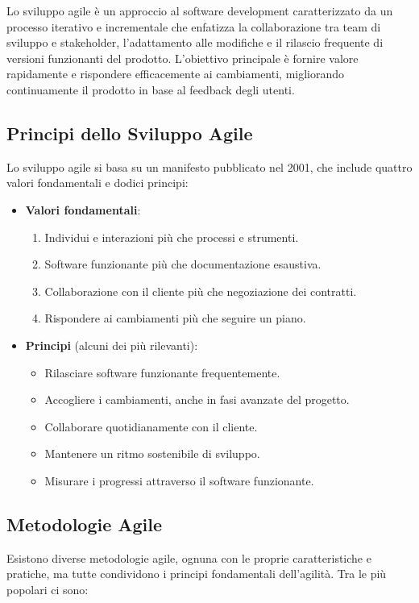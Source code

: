 \documentclass{article}
\begin{document}
Lo sviluppo agile è un approccio al software development caratterizzato da un processo iterativo e incrementale che enfatizza la collaborazione tra team di sviluppo e stakeholder, l'adattamento alle modifiche e il rilascio frequente di versioni funzionanti del prodotto. L'obiettivo principale è fornire valore rapidamente e rispondere efficacemente ai cambiamenti, migliorando continuamente il prodotto in base al feedback degli utenti.

\subsection*{Principi dello Sviluppo Agile}
Lo sviluppo agile si basa su un manifesto pubblicato nel 2001, che include quattro valori fondamentali e dodici principi:

\begin{itemize}
    \item \textbf{Valori fondamentali}:
    \begin{enumerate}
        \item Individui e interazioni più che processi e strumenti.
        \item Software funzionante più che documentazione esaustiva.
        \item Collaborazione con il cliente più che negoziazione dei contratti.
        \item Rispondere ai cambiamenti più che seguire un piano.
    \end{enumerate}
    
    \item \textbf{Principi} (alcuni dei più rilevanti):
    \begin{itemize}
        \item Rilasciare software funzionante frequentemente.
        \item Accogliere i cambiamenti, anche in fasi avanzate del progetto.
        \item Collaborare quotidianamente con il cliente.
        \item Mantenere un ritmo sostenibile di sviluppo.
        \item Misurare i progressi attraverso il software funzionante.
    \end{itemize}
\end{itemize}

\subsection{Metodologie Agile}
Esistono diverse metodologie agile, ognuna con le proprie caratteristiche e pratiche, ma tutte condividono i principi fondamentali dell'agilità. Tra le più popolari ci sono:
\end{document}
